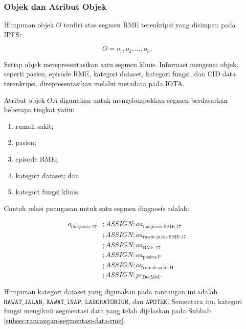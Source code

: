 \subsubsection{Objek dan Atribut Objek}

Himpunan objek $O$ terdiri atas segmen RME terenkripsi yang disimpan pada IPFS:

\begin{equation}
	O = {o_1,o_2,\ldots,o_n}.
\end{equation}

Setiap objek merepresentasikan satu segmen klinis. Informasi mengenai objek, seperti pasien, episode RME, kategori dataset, kategori fungsi, dan CID data terenkripsi, direpresentasikan melalui metadata pada IOTA.

Atribut objek $OA$ digunakan untuk mengelompokkan segmen berdasarkan beberapa tingkat yaitu:

\begin{enumerate}
	\item rumah sakit;
	\item pasien;
	\item episode RME;
	\item kategori dataset; dan
	\item kategori fungsi klinis.
\end{enumerate}

Contoh relasi penugasan untuk satu segmen diagnosis adalah:

\begin{equation}
	\begin{aligned}
		o_{\text{diagnosis-17}}
		 & ; ASSIGN ;
		oa_{\text{diagnosis-RME-17}}   \\
		 & ; ASSIGN ;
		oa_{\text{rawat-jalan-RME-17}} \\
		 & ; ASSIGN ;
		oa_{\text{RME-17}}             \\
		 & ; ASSIGN ;
		oa_{\text{pasien-P}}           \\
		 & ; ASSIGN ;
		oa_{\text{rumah-sakit-H}}      \\
		 & ; ASSIGN ;
		pc_{\text{DecMed}}.
	\end{aligned}
\end{equation}

Himpunan kategori dataset yang digunakan pada rancangan ini adalah $\texttt{RAWAT\_JALAN}$, $\texttt{RAWAT\_INAP}$, $\texttt{LABORATORIUM}$, dan $\texttt{APOTEK}$. Sementara itu, kategori fungsi mengikuti segmentasi data yang telah dijelaskan pada Subbab \ref{subsec:rancangan-segmentasi-data-rme}.

